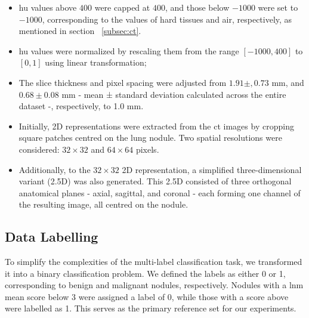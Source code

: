 \begin{itemize}
    \item \ac{hu} values above $400$ were capped at $400$, and those below $-1000$ were set to $-1000$, corresponding to the values of hard tissues and air, respectively, as mentioned in section ~\ref{subsec:ct}.

    \item \ac{hu} values were normalized by rescaling them from the range $[-1000, 400]$ to $[0, 1]$ using linear transformation;

    \item The slice thickness and pixel spacing were adjusted from $1.91 \pm, 0.73$ mm, and $0.68 \pm 0.08$ mm - mean ± standard deviation calculated across the entire dataset -, respectively, to 1.0 mm.

    \item Initially, 2D representations were extracted from the \ac{ct} images by cropping square patches centred on the lung nodule. Two spatial resolutions were considered: $32 \times 32$ and $64 \times 64$ pixels. %

    \item Additionally, to the $32 \times 32$ 2D representation, a simplified three-dimensional variant (2.5D) was also generated. This 2.5D consisted of three orthogonal anatomical planes - axial, sagittal, and coronal - each forming one channel of the resulting image, all centred on the nodule. %


\end{itemize}


\subsection{Data Labelling}

To simplify the complexities of the multi-label classification task, we transformed it into a binary classification problem. We defined the labels as either 0 or 1, corresponding to benign and malignant nodules, respectively. Nodules with a \ac{lnm} mean score below 3 were assigned a label of 0, while those with a score above were labelled as 1. This serves as the primary reference set for our experiments.

